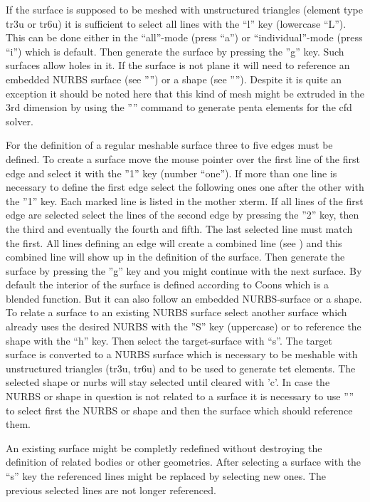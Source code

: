 \documentclass{article}
\begin{document}
If the surface is supposed to be meshed with unstructured triangles (element type tr3u or tr6u) it is sufficient to select all lines with the ``l'' key (lowercase ``L''). This can be done either in the ``all''-mode (press ``a'') or ``individual''-mode (press ``i'') which is default. Then generate the surface by pressing the ''g'' key. Such surfaces allow holes in it. If the surface is not plane it will need to reference an embedded NURBS surface (see '''') or a shape (see ''''). Despite it is quite an exception it should be noted here that this kind of mesh might be extruded in the 3rd dimension by using the '''' command to generate penta elements for the cfd solver.

For the definition of a regular meshable surface three to five edges must be
defined. To create a surface move the mouse pointer over the first line of the
first edge and select it with the ''1'' key (number ``one''). If more than one
line is necessary to define the first edge select the following ones one after
the other with the ''1'' key. Each marked line is listed in the mother
xterm. If all lines of the first edge are selected select the lines of the
second edge by pressing the ''2'' key, then the third and eventually the
fourth and fifth. The last selected line must match the first. All lines
defining an edge will create a combined line (see ) and
this combined line will show up in the definition of the surface. Then
generate the surface by pressing the ''g'' key and you might continue with the
next surface. By default the interior of the surface is defined according to
Coons \cite{Coons} which is a blended function. But it can also follow an
embedded NURBS-surface or a shape. To relate a surface to an existing NURBS
surface select another surface which already uses the desired NURBS with the
''S'' key (uppercase) or to reference the shape with the ``h'' key. Then
select the target-surface with ``s''. The target surface is converted to a
NURBS surface which is necessary to be meshable with unstructured triangles
(tr3u, tr6u) and to be used to generate tet elements. The selected shape or nurbs will stay selected until cleared with 'c'. In case the NURBS or shape in question is not related to a surface it is necessary to use '''' to select first the NURBS or shape and then the surface which should reference them.  

An existing surface might be completly redefined without destroying the definition of related bodies or other geometries. After selecting a surface with the ``s'' key the referenced lines might be replaced by selecting new ones. The previous selected lines are not longer referenced.
\end{document}
